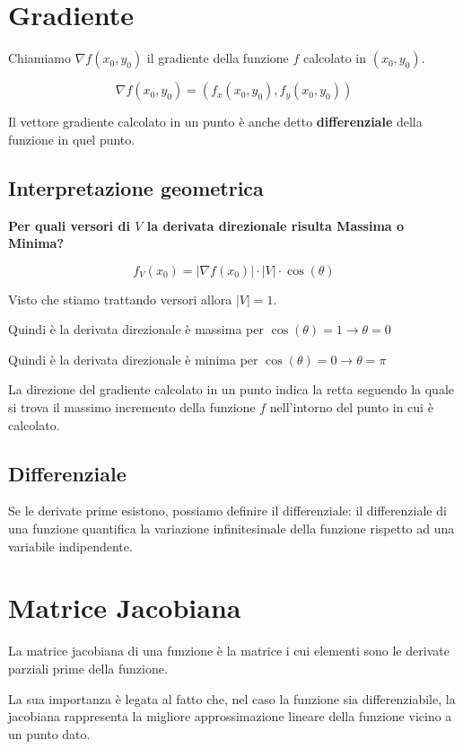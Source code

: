 \section{Gradiente}

Chiamiamo $\nabla f(x_0,y_0)$ il gradiente della funzione $f$ calcolato in $(x_0,y_0)$.

$$ \nabla f(x_0,y_0) = (f_x(x_0,y_0),f_y(x_0,y_0))$$

Il vettore gradiente calcolato in un punto è anche detto \textbf{differenziale} della funzione in quel punto.

\subsection{Interpretazione geometrica}

\textbf{Per quali versori di $V$ la derivata direzionale risulta Massima o Minima?}

$$
f_V(x_0)  = |\nabla f(x_0)| \cdot |V| \cdot \cos(\theta)
$$

Visto che stiamo trattando versori allora $|V|=1$.

Quindi è la derivata direzionale è massima per $\cos(\theta)=1 \rightarrow \theta=0$

Quindi è la derivata direzionale è minima per $\cos(\theta)=0 \rightarrow \theta=\pi$

La direzione del gradiente calcolato in un punto indica la retta seguendo la quale si trova il massimo incremento della funzione $f$ nell'intorno del punto in cui è calcolato.

\subsection{Differenziale}

Se le derivate prime esistono, possiamo definire il differenziale: il differenziale di una funzione quantifica la variazione infinitesimale della funzione rispetto ad una variabile indipendente.

\section{Matrice Jacobiana}

La matrice jacobiana di una funzione è la matrice i cui elementi sono le derivate parziali prime della funzione.

La sua importanza è legata al fatto che, nel caso la funzione sia differenziabile, la jacobiana rappresenta la migliore approssimazione lineare della funzione vicino a un punto dato.

